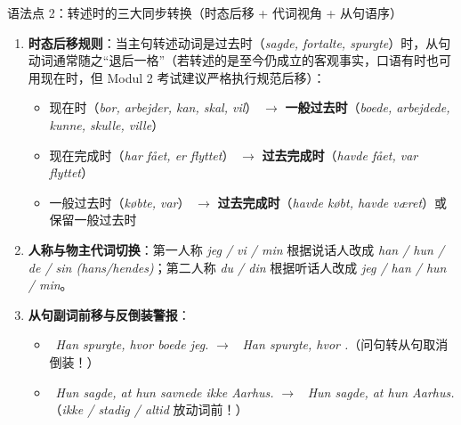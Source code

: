 \begin{grammatikbox}{语法点 2：转述时的三大同步转换（时态后移 + 代词视角 + 从句语序）}
\begin{enumerate}
  \item \textbf{时态后移规则}：当主句转述动词是过去时（\textit{sagde, fortalte, spurgte}）时，从句动词通常随之“退后一格”（若转述的是至今仍成立的客观事实，口语有时也可用现在时，但 Modul 2 考试建议严格执行规范后移）：
    \begin{itemize}
      \item 现在时（\textit{bor, arbejder, kan, skal, vil}） $\rightarrow$ \textbf{一般过去时}（\textit{boede, arbejdede, kunne, skulle, ville}）
      \item 现在完成时（\textit{har fået, er flyttet}） $\rightarrow$ \textbf{过去完成时}（\textit{havde fået, var flyttet}）
      \item 一般过去时（\textit{købte, var}） $\rightarrow$ \textbf{过去完成时}（\textit{havde købt, havde været}）或保留一般过去时
    \end{itemize}
  \item \textbf{人称与物主代词切换}：第一人称 \textit{jeg / vi / min} 根据说话人改成 \textit{han / hun / de / sin (hans/hendes)}；第二人称 \textit{du / din} 根据听话人改成 \textit{jeg / han / hun / min}。
  \item \textbf{从句副词前移与反倒装警报}：
    \begin{itemize}
      \item {}\ \textit{Han spurgte, hvor boede jeg.} $\rightarrow$ \ \textit{Han spurgte, hvor .}（问句转从句取消倒装！）
      \item {}\ \textit{Hun sagde, at hun savnede ikke Aarhus.} $\rightarrow$ \ \textit{Hun sagde, at hun  Aarhus.}（\textit{ikke / stadig / altid} 放动词前！）
    \end{itemize}
\end{enumerate}
\end{grammatikbox}


